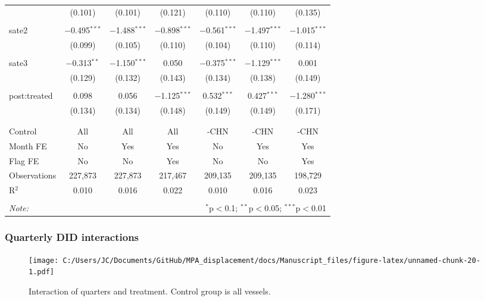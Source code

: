 \documentclass[11pt,]{article}
\begin{document}
\begin{table}[!htbp]
\begin{tabular}{@{\extracolsep{1pt}}lcccccc}
  & (0.101) & (0.101) & (0.121) & (0.110) & (0.110) & (0.135) \\ 
  & & & & & & \\ 
 sate2 & $-$0.495$^{***}$ & $-$1.488$^{***}$ & $-$0.898$^{***}$ & $-$0.561$^{***}$ & $-$1.497$^{***}$ & $-$1.015$^{***}$ \\ 
  & (0.099) & (0.105) & (0.110) & (0.104) & (0.110) & (0.114) \\ 
  & & & & & & \\ 
 sate3 & $-$0.313$^{**}$ & $-$1.150$^{***}$ & 0.050 & $-$0.375$^{***}$ & $-$1.129$^{***}$ & 0.001 \\ 
  & (0.129) & (0.132) & (0.143) & (0.134) & (0.138) & (0.149) \\ 
  & & & & & & \\ 
 post:treated & 0.098 & 0.056 & $-$1.125$^{***}$ & 0.532$^{***}$ & 0.427$^{***}$ & $-$1.280$^{***}$ \\ 
  & (0.134) & (0.134) & (0.148) & (0.149) & (0.149) & (0.171) \\ 
  & & & & & & \\ 
\hline \\[-1.8ex] 
Control & All & All & All & -CHN & -CHN & -CHN \\ 
Month FE & No & Yes & Yes & No & Yes & Yes \\ 
Flag FE & No & No & Yes & No & No & Yes \\ 
Observations & 227,873 & 227,873 & 217,467 & 209,135 & 209,135 & 198,729 \\ 
R$^{2}$ & 0.010 & 0.016 & 0.022 & 0.010 & 0.016 & 0.023 \\ 
\hline 
\hline \\[-1.8ex] 
\textit{Note:}  & \multicolumn{6}{r}{$^{*}$p$<$0.1; $^{**}$p$<$0.05; $^{***}$p$<$0.01} \\ 
\end{tabular} 
\end{table}

\clearpage

\hypertarget{quarterly-did-interactions}{%
\subsubsection{Quarterly DID
interactions}\label{quarterly-did-interactions}}

\begin{figure}
\centering
\texttt{[image: C:/Users/JC/Documents/GitHub/MPA\_displacement/docs/Manuscript\_files/figure-latex/unnamed-chunk-20-1.pdf]}
\caption{\label{fig:unnamed-chunk-20}\label{fig:q1}Interaction of quarters
and treatment. Control group is all vessels.}
\end{figure}
\end{document}
